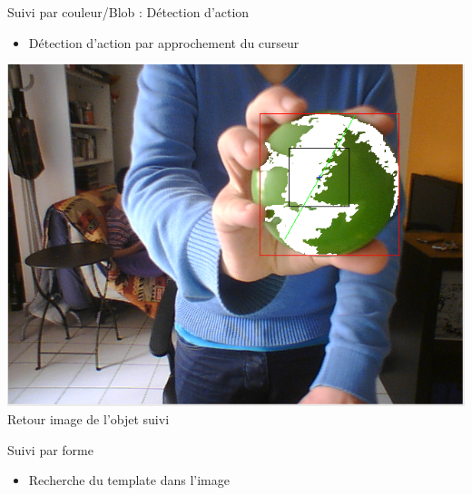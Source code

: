 \documentclass{beamer}
\begin{document}
		\begin{frame}{Suivi par couleur/Blob : Détection d'action}
			\begin{itemize}
				\item{Détection d'action par approchement du curseur}
			\end{itemize}
			\begin{center}
				\includegraphics[scale=0.25]{Capture3.png}\\
				Retour image de l'objet suivi
			\end{center}
		\end{frame}
		\begin{frame}{Suivi par forme}
			\begin{itemize}
				\item{Recherche du template dans l'image}
			\end{itemize}
		\end{frame}
\end{document}
